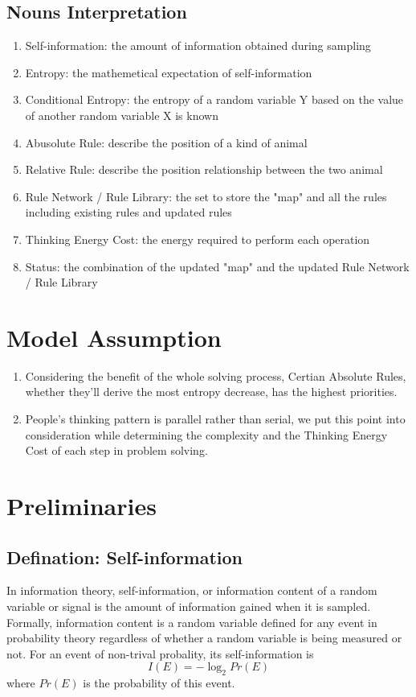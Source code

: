 \documentclass[12pt,a4paper,]{article}
\begin{document}
\subsection{Nouns Interpretation}
\begin{enumerate}[(1)]
\item Self-information: the amount of information obtained during sampling
\item Entropy: the mathemetical expectation of self-information
\item Conditional Entropy: the entropy of a random variable Y based on the value of another random variable X is known
\item Abusolute Rule: describe the position of a kind of animal
\item Relative Rule: describe the position relationship between the two animal
\item Rule Network / Rule Library: the set to store the "map" and all the rules including existing rules and updated rules
\item Thinking Energy Cost: the energy required to perform each operation
\item Status: the combination of the updated "map" and the updated Rule Network / Rule Library

\end{enumerate}
\section{Model Assumption}
\begin{enumerate}[(1)]
\item Considering the benefit of the whole solving process, Certian Absolute Rules, whether they'll derive the most entropy decrease, has the highest priorities.
\item People's thinking pattern is parallel rather than serial, we put this point into consideration while determining the complexity and the Thinking Energy Cost of each step in problem solving.
\end{enumerate}


\section{Preliminaries}
\subsection{Defination: Self-information}
In information theory, self-information, or information content of a random variable or signal is the amount of information gained when it is sampled. Formally, information content is a random variable defined for any event in probability theory regardless of whether a random variable is being measured or not. For an event of non-trival probality, its self-information is
\begin{equation}
I(E) = -\log_{2}{Pr(E)}
\end{equation}
where $Pr(E)$ is the probability of this event.
\end{document}
